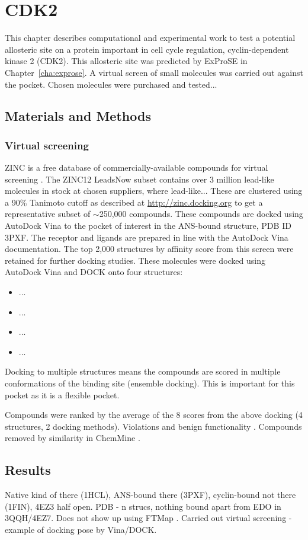 \chapter{CDK2}
\label{cha:cdk2}

This chapter describes computational and experimental work to test a potential allosteric site on a protein important in cell cycle regulation, cyclin-dependent kinase 2 (CDK2).
This allosteric site was predicted by ExProSE in Chapter~\ref{cha:exprose}.
A virtual screen of small molecules was carried out against the pocket.
Chosen molecules were purchased and tested...


\section{Materials and Methods}

\subsection{Virtual screening}

ZINC is a free database of commercially-available compounds for virtual screening \cite{Sterling2015}.
The ZINC12 LeadsNow subset contains over 3 million lead-like molecules in stock at chosen suppliers, where lead-like...
These are clustered using a 90\% Tanimoto cutoff as described at \url{http://zinc.docking.org} to get a representative subset of $\sim$250,000 compounds.
These compounds are docked using AutoDock Vina \cite{Trott2010} to the pocket of interest in the ANS-bound structure, PDB ID 3PXF.
The receptor and ligands are prepared in line with the AutoDock Vina documentation.
The top 2,000 structures by affinity score from this screen were retained for further docking studies.
These molecules were docked using AutoDock Vina and DOCK \cite{Allen2015} onto four structures:
\begin{itemize}
\item ...
\item ...
\item ...
\item ...
\end{itemize}
Docking to multiple structures means the compounds are scored in multiple conformations of the binding site (ensemble docking).
This is important for this pocket as it is a flexible pocket.

Compounds were ranked by the average of the 8 scores from the above docking (4 structures, 2 docking methods).
Violations and benign functionality \cite{Daina2017}.
Compounds removed by similarity in ChemMine \cite{Backman2011}.



\section{Results}

Native kind of there (1HCL), ANS-bound there (3PXF), cyclin-bound not there (1FIN), 4EZ3 half open.
PDB - n strucs, nothing bound apart from EDO in 3QQH/4EZ7.
Does not show up using FTMap \cite{Kozakov2015}.
Carried out virtual screening - example of docking pose by Vina/DOCK.
